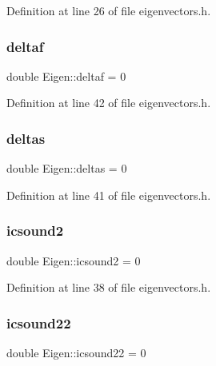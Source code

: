 Definition at line 26 of file eigenvectors.\+h.

\mbox{\label{classEigen_aabedb922cff2469aeaa9c75d74c2f151}} 
\subsubsection{\texorpdfstring{deltaf}{deltaf}}
{\footnotesize\ttfamily double Eigen\+::deltaf = 0\hspace{0.3cm}{\ttfamily [private]}}



Definition at line 42 of file eigenvectors.\+h.

\mbox{\label{classEigen_aeba5919259de19a63da3e9fd6ea80533}} 
\subsubsection{\texorpdfstring{deltas}{deltas}}
{\footnotesize\ttfamily double Eigen\+::deltas = 0\hspace{0.3cm}{\ttfamily [private]}}



Definition at line 41 of file eigenvectors.\+h.

\mbox{\label{classEigen_a00f80efb3753a6573c599d9aef539c99}} 
\subsubsection{\texorpdfstring{icsound2}{icsound2}}
{\footnotesize\ttfamily double Eigen\+::icsound2 = 0\hspace{0.3cm}{\ttfamily [private]}}



Definition at line 38 of file eigenvectors.\+h.

\mbox{\label{classEigen_afdfefe363a4791580f5afa9c3c54a820}} 
\subsubsection{\texorpdfstring{icsound22}{icsound22}}
{\footnotesize\ttfamily double Eigen\+::icsound22 = 0\hspace{0.3cm}{\ttfamily [private]}}



